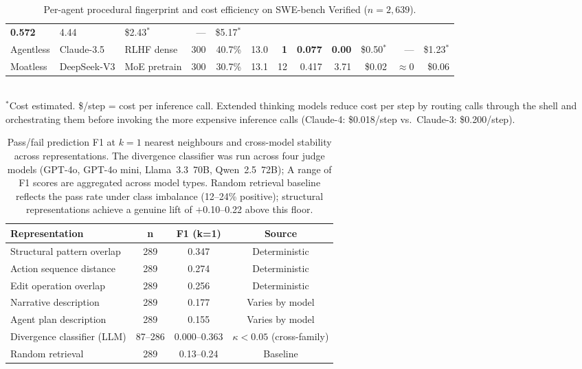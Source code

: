 \documentclass[11pt]{article}
\begin{document}
\begin{table}[H]
{\begin{tabular}{lllrrrrrrrrr}
  \textbf{0.572} & 4.44 & \$2.43$^*$ & --- & \$5.17$^*$ \\
  \rowcolor{owbg}
  Agentless & Claude-3.5           & RLHF dense        & 300 & 40.7\% & 13.0 & \textbf{1}
  & \textbf{0.077} & \textbf{0.00} & \$0.50$^*$ & --- & \$1.23$^*$ \\
  \rowcolor{owbg}
  Moatless  & DeepSeek-V3          & MoE pretrain      & 300 & 30.7\% & 13.1 & 12 & 0.417
  & 3.71 & \$0.02 & ${\approx}0$ & \$0.06 \\
  \bottomrule
  \end{tabular}%
  }
  \\[0.3em]
  {\footnotesize $^*$Cost estimated. \$/step = cost per inference call.
Extended thinking models reduce cost per step by routing calls through the shell
and orchestrating them before invoking the more expensive inference calls
(Claude-4: \$0.018/step vs.\ Claude-3: \$0.200/step).}
  \caption{Per-agent procedural fingerprint and cost efficiency on SWE-bench Verified
  ($n=2{,}639$).}
  \label{tab:per-agent-megatable}
  \end{table}

 \begin{table}[h]
  \centering\small
  \begin{tabular}{lccc}
  \toprule
  \textbf{Representation} & \textbf{n} & \textbf{F1 (k=1)} & \textbf{Source} \\
  \midrule
  Structural pattern overlap  & 289 & 0.347 & Deterministic \\
  Action sequence distance    & 289 & 0.274 & Deterministic \\
  Edit operation overlap      & 289 & 0.256 & Deterministic \\
  Narrative description       & 289 & 0.177 & Varies by model \\
  Agent plan description      & 289 & 0.155 & Varies by model \\
  Divergence classifier (LLM) & 87--286 & 0.000--0.363 & $\kappa < 0.05$ (cross-family) \\
  \midrule
  Random retrieval            & 289 & 0.13--0.24 & Baseline \\
  \bottomrule
  \end{tabular}
  \caption{Pass/fail prediction F1 at $k{=}1$ nearest neighbours and cross-model
    stability across representations. The divergence classifier was run across four
    judge models (GPT-4o, GPT-4o mini, Llama~3.3~70B, Qwen~2.5~72B); A range of F1 scores
  are aggregated across model types. Random retrieval baseline reflects the pass rate
  under class imbalance (12--24\% positive); structural representations achieve a genuine
  lift of $+$0.10--0.22 above this floor.}
  \label{tab:representation_comparison}
  \end{table}
\end{document}
